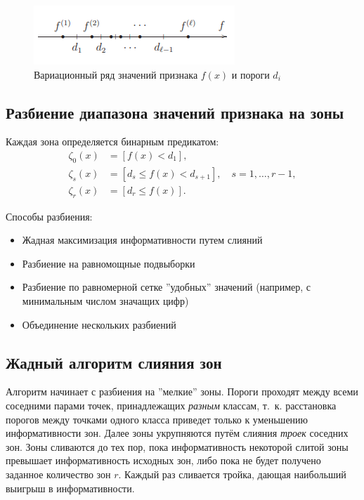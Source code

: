 \begin{figure}
    \centering
    \includegraphics[scale = 1]{images/bin1.png}
    \caption{Вариационный ряд значений признака $f(x)$ и пороги $d_i$}
\end{figure}

\subsection{Разбиение диапазона значений признака на зоны}

Каждая зона определяется бинарным предикатом:
\begin{align*}
\zeta_0(x) &= [f(x) < d_1], \\
\zeta_s(x) &= [d_s \leq f(x) < d_{s+1}], \quad s = 1, \dots, r-1, \\
\zeta_r(x) &= [d_r \leq f(x)].
\end{align*}

Способы разбиения:
\begin{itemize}
    \item Жадная максимизация информативности путем слияний
    \item Разбиение на равномощные подвыборки
    \item Разбиение по равномерной сетке ''удобных'' значений (например, с минимальным числом значащих цифр)
    \item Объединение нескольких разбиений
\end{itemize}

\subsection{Жадный алгоритм слияния зон}

Алгоритм начинает с разбиения на ''мелкие'' зоны. Пороги проходят между всеми соседними парами точек, принадлежащих \emph{разным} классам, т.~к. расстановка порогов между точками одного класса приведет только к уменьшению информативности зон. Далее зоны укрупняются путём слияния \emph{троек} соседних зон. Зоны сливаются до тех пор, пока
информативность некоторой слитой зоны превышает информативность
исходных зон, либо пока не будет получено заданное количество зон $r$. Каждый раз сливается тройка, дающая наибольший выигрыш в информативности.


